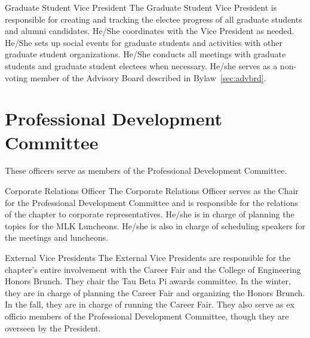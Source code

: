 \begin{enumsubsection}
\item{Graduate Student Vice President} The Graduate Student Vice President is responsible for creating and tracking the electee progress of all graduate students and alumni candidates. He/She coordinates with the Vice President as needed. He/She sets up social events for graduate students and activities with other graduate student organizations. He/She conducts all meetings with graduate students and graduate student electees when necessary. He/she serves as a non-voting member of the Advisory Board described in Bylaw~\ref{sec:advbrd}.

\end{enumsubsection}

\section{Professional Development Committee}\label{sec:PDTeam}
These officers serve as members of the Professional Development Committee.
\begin{enumsubsection}
\item{Corporate Relations Officer} The Corporate Relations Officer serves as the Chair for the Professional Development Committee and is  responsible for the relations of the chapter to corporate representatives. He/she is in charge of planning the topics for the MLK Luncheons. He/she is also  in charge of scheduling speakers for the meetings and luncheons. 
\item{External Vice Presidents} The External Vice Presidents are responsible for the chapter's entire involvement with the Career Fair and the College of Engineering Honors Brunch. They chair the Tau Beta Pi awards committee. In the winter, they are in charge of planning the Career Fair and organizing the Honors Brunch. In the fall, they are in charge of running the Career Fair. They also serve as ex officio members of the Professional Development Committee, though they are overseen by the President.
\end{enumsubsection}

